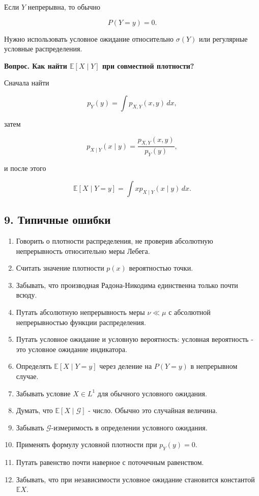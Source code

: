 \documentclass[
  11pt,
  a4paper,
]{article}
\providecommand{\tightlist}{%
  \setlength{\itemsep}{0pt}\setlength{\parskip}{0pt}}
\begin{document}
Если \(Y\) непрерывна, то обычно

\[
P(Y=y)=0.
\]

Нужно использовать условное ожидание относительно \(\sigma(Y)\) или
регулярные условные распределения.

\textbf{Вопрос. Как найти \(\mathbb E[X\mid Y]\) при совместной
плотности?}

Сначала найти

\[
p_Y(y)=\int p_{X,Y}(x,y)\,dx,
\]

затем

\[
p_{X\mid Y}(x\mid y)=\frac{p_{X,Y}(x,y)}{p_Y(y)},
\]

и после этого

\[
\mathbb E[X\mid Y=y]=\int x p_{X\mid Y}(x\mid y)\,dx.
\]

\subsection{9. Типичные
ошибки}\label{ux442ux438ux43fux438ux447ux43dux44bux435-ux43eux448ux438ux431ux43aux438}

\begin{enumerate}
\def\labelenumi{\arabic{enumi}.}
\tightlist
\item
  Говорить о плотности распределения, не проверив абсолютную
  непрерывность относительно меры Лебега.
\item
  Считать значение плотности \(p(x)\) вероятностью точки.
\item
  Забывать, что производная Радона-Никодима единственна только почти
  всюду.
\item
  Путать абсолютную непрерывность меры \(\nu\ll\mu\) с абсолютной
  непрерывностью функции распределения.
\item
  Путать условное ожидание и условную вероятность: условная вероятность
  - это условное ожидание индикатора.
\item
  Определять \(\mathbb E[X\mid Y=y]\) через деление на \(P(Y=y)\) в
  непрерывном случае.
\item
  Забывать условие \(X\in L^1\) для обычного условного ожидания.
\item
  Думать, что \(\mathbb E[X\mid\mathcal G]\) - число. Обычно это
  случайная величина.
\item
  Забывать \(\mathcal G\)-измеримость в определении условного ожидания.
\item
  Применять формулу условной плотности при \(p_Y(y)=0\).
\item
  Путать равенство почти наверное с поточечным равенством.
\item
  Забывать, что при независимости условное ожидание становится
  константой \(\mathbb EX\).
\end{enumerate}
\end{document}
